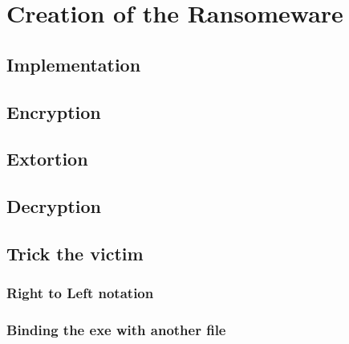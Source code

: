 \chapter{Creation of the Ransomeware}\label{Creation of the Ransomeware}

\section{Implementation}\label{implementation}

\section{Encryption}\label{encryption}


\section{Extortion}\label{Extortion}

\section{Decryption}\label{Decryption}

\section{Trick the victim}\label{Trick the victim}

\subsection{Right to Left notation}\label{Right to Left notation}

\subsection{Binding the exe with another file}\label{Binding}
